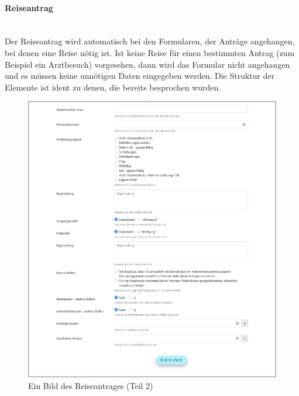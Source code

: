 \paragraph{Reiseantrag}
~\\
Der Reiseantrag wird automatisch bei den Formularen, der Anträge angehangen, bei denen eine Reise nötig ist. Ist keine Reise für einen bestimmten Antrag (zum Beispiel ein Arztbesuch) vorgesehen, dann wird das Formular nicht angehangen und es müssen keine unnötigen Daten eingegeben werden. Die Struktur der Elemente ist ident zu denen, die bereits besprochen wurden.
\begin{figure}[H]
	\centering
	\includegraphics[width=1\linewidth]{images/website/zusatz_1}
	\caption[Neuer Schulantrag]{Ein Bild des Reiseantrages (Teil 2)}
	\label{fig:zusatz1}
\end{figure}

